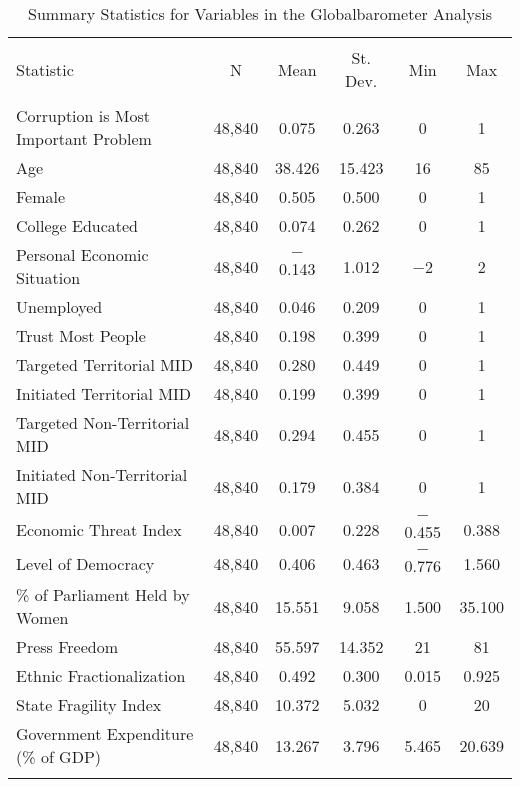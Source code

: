 \documentclass[11pt,]{article}
\begin{document}
\begin{table}[!htbp] \centering 
  \caption{Summary Statistics for Variables in the Globalbarometer Analysis} 
  \label{tab:summarygb} 
\begin{tabular}{@{\extracolsep{5pt}}lccccc} 
\\[-1.8ex]\hline 
\hline \\[-1.8ex] 
Statistic & \multicolumn{1}{c}{N} & \multicolumn{1}{c}{Mean} & \multicolumn{1}{c}{St. Dev.} & \multicolumn{1}{c}{Min} & \multicolumn{1}{c}{Max} \\ 
\hline \\[-1.8ex] 
Corruption is Most Important Problem & 48,840 & 0.075 & 0.263 & 0 & 1 \\ 
Age & 48,840 & 38.426 & 15.423 & 16 & 85 \\ 
Female & 48,840 & 0.505 & 0.500 & 0 & 1 \\ 
College Educated & 48,840 & 0.074 & 0.262 & 0 & 1 \\ 
Personal Economic Situation & 48,840 & $-$0.143 & 1.012 & $-$2 & 2 \\ 
Unemployed & 48,840 & 0.046 & 0.209 & 0 & 1 \\ 
Trust Most People & 48,840 & 0.198 & 0.399 & 0 & 1 \\ 
Targeted Territorial MID & 48,840 & 0.280 & 0.449 & 0 & 1 \\ 
Initiated Territorial MID & 48,840 & 0.199 & 0.399 & 0 & 1 \\ 
Targeted Non-Territorial MID & 48,840 & 0.294 & 0.455 & 0 & 1 \\ 
Initiated Non-Territorial MID & 48,840 & 0.179 & 0.384 & 0 & 1 \\ 
Economic Threat Index & 48,840 & 0.007 & 0.228 & $-$0.455 & 0.388 \\ 
Level of Democracy & 48,840 & 0.406 & 0.463 & $-$0.776 & 1.560 \\ 
\% of Parliament Held by Women & 48,840 & 15.551 & 9.058 & 1.500 & 35.100 \\ 
Press Freedom & 48,840 & 55.597 & 14.352 & 21 & 81 \\ 
Ethnic Fractionalization & 48,840 & 0.492 & 0.300 & 0.015 & 0.925 \\ 
State Fragility Index & 48,840 & 10.372 & 5.032 & 0 & 20 \\ 
Government Expenditure (\% of GDP) & 48,840 & 13.267 & 3.796 & 5.465 & 20.639 \\ 
\hline \\[-1.8ex] 
\end{tabular} 
\end{table}
\end{document}
